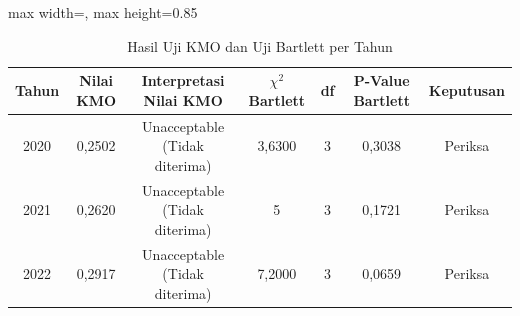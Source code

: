 \begin{table}[H]
\centering
\caption{Hasil Uji KMO dan Uji Bartlett per Tahun} \label{tab:sample1kmo_bartlett}
\begin{adjustbox}{max width=\textwidth, max height=0.85\textheight}
\begin{tabular}{|c|c|c|c|c|c|c|}
\hline
\textbf{Tahun} & \textbf{Nilai KMO} & \textbf{Interpretasi Nilai KMO} & \textbf{$\chi^2$ Bartlett} & \textbf{df} & \textbf{P-Value Bartlett} & \textbf{Keputusan} \\
\hline
2020 & 0,2502 & Unacceptable (Tidak diterima) & 3,6300 & 3 & 0,3038 & Periksa \\
2021 & 0,2620 & Unacceptable (Tidak diterima) & 5 & 3 & 0,1721 & Periksa \\
2022 & 0,2917 & Unacceptable (Tidak diterima) & 7,2000 & 3 & 0,0659 & Periksa \\
\hline
\end{tabular}
\end{adjustbox}
\end{table}